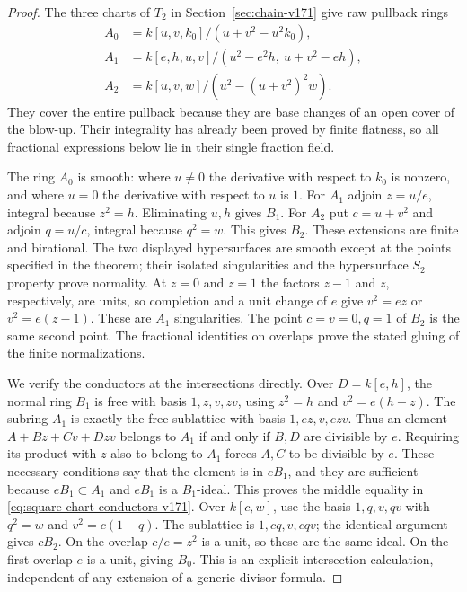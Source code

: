 \documentclass[11pt,reqno]{amsart}
\numberwithin{equation}{section}
\theoremstyle{definition}\newtheorem{definition}[theorem]{Definition}
\theoremstyle{remark}\newtheorem{remark}[theorem]{Remark}
\begin{document}
\begin{proof}
The three charts of $T_2$ in Section~\ref{sec:chain-v171} give raw
pullback rings
\begin{align*}
 A_0&=k[u,v,k_0]/(u+v^2-u^2k_0),\\
 A_1&=k[e,h,u,v]/(u^2-e^2h,\ u+v^2-eh),\\
 A_2&=k[u,v,w]/(u^2-(u+v^2)^2w).
\end{align*}
They cover the entire pullback because they are base changes of an
open cover of the blow-up. Their integrality has already been proved
by finite flatness, so all fractional expressions below lie in their
single fraction field.

The ring $A_0$ is smooth: where $u\ne0$ the derivative with respect to
$k_0$ is nonzero, and where $u=0$ the derivative with respect to $u$
is $1$. For $A_1$ adjoin $z=u/e$, integral because $z^2=h$. Eliminating
$u,h$ gives $B_1$. For $A_2$ put $c=u+v^2$ and adjoin $q=u/c$,
integral because $q^2=w$. This gives $B_2$. These extensions are
finite and birational. The two displayed hypersurfaces are smooth
except at the points specified in the theorem; their isolated
singularities and the hypersurface $S_2$ property prove normality.
At $z=0$ and $z=1$ the factors $z-1$ and $z$, respectively, are units,
so completion and a unit change of $e$ give $v^2=ez$ or $v^2=e(z-1)$.
These are $A_1$ singularities. The point $c=v=0,q=1$ of $B_2$ is the
same second point. The fractional identities on overlaps prove the
stated gluing of the finite normalizations.

We verify the conductors at the intersections directly. Over
$D=k[e,h]$, the normal ring $B_1$ is free with basis
$1,z,v,zv$, using $z^2=h$ and $v^2=e(h-z)$. The subring $A_1$ is
exactly the free sublattice with basis $1,ez,v,ezv$. Thus an element
$A+Bz+Cv+Dzv$ belongs to $A_1$ if and only if $B,D$ are divisible by
$e$. Requiring its product with $z$ also to belong to $A_1$ forces
$A,C$ to be divisible by $e$. These necessary conditions say that
the element is in $eB_1$, and they are sufficient because
$eB_1\subset A_1$ and $eB_1$ is a $B_1$-ideal. This proves the
middle equality in \eqref{eq:square-chart-conductors-v171}.
Over $k[c,w]$, use the basis $1,q,v,qv$ with $q^2=w$ and
$v^2=c(1-q)$. The sublattice is $1,cq,v,cqv$; the identical argument
gives $cB_2$. On the overlap $c/e=z^2$ is a unit, so these are the
same ideal. On the first overlap $e$ is a unit, giving $B_0$.
This is an explicit intersection calculation, independent of any
extension of a generic divisor formula.


\end{proof}
\end{document}
